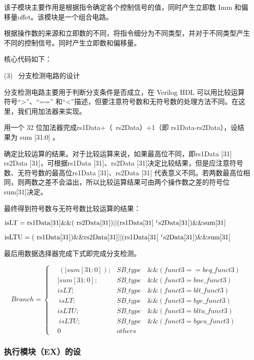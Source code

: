 \documentclass{../source/Experiment}
\begin{document}
        该子模块主要作用是根据指令确定各个控制信号的值，同时产生立即数 Imm 和偏移量offet。该模块是一个组合电路。

        根据操作数的来源和立即数的不同，将指令细分为不同类型，并对于不同类型产生不同的控制信号。同时产生立即数和偏移量。

        核心代码如下：

        (3) \, 分支检测电路的设计

        分支检测电路主要用于判断分支条件是否成立，在 Verilog HDL 可以用比较运算符号“>”、“==” 和“<”描述，但要注意符号数和无符号数的处理方法不同。在这里，我们用加法器来实现。

        用一个 32 位加法器完成rs1Data+（~rs2Data）+1（即 rs1Data-rs2Data），设结果为 sum [31:0] 。

        确定比较运算的结果。对于比较运算来说，如果最高位不同，即rs1Data [31]  rs2Data [31]，可根据rs1Data [31]、rs2Data [31]决定比较结果，但是应注意符号数、无符号数的最高位rs1Data [31]、rs2Data [31] 代表意义不同。若两数最高位相同，则两数之差不会溢出，所以比较运算结果可由两个操作数之差的符号位 sum[31]决定。

        最终得到符号数与无符号数比较运算的结果：

        $ \rm isLT=rs1Data[31]\&\&(~rs2Data[31]) || (rs1Data[31]~^rs2Data[31]) \&\& sum[31]$

        $ \rm isLTU= (~rs1Data[31] )\&\& rs2Data[31] || (rs1Data[31]~^rs2Data[31]) \&\& sum[31]$

        最后用数据选择器完成下式即完成分支检测。

        $$Branch = \left\{
            \begin{aligned}
             & ~ (| sum[31 : 0]); & SB\_type & \, \& \& (funct3 == beq\_funct3 )\\
             & | sum[31 : 0];  & SB\_type & \, \& \& (funct3 = bne\_funct3 )\\
             & isLT;  & SB\_type & \, \& \&(funct3 = blt\_funct3 )\\
             & ~ isLT ;  & SB\_type & \, \& \& (funct3 = bge\_funct3 )\\
             & isLTU ;  & SB\_type & \, \& \& (funct3 = bltu\_funct 3)\\
             & ~ isLTU ;  & SB\_type & \, \& \& (funct3 = bgeu\_funct3)\\
             & 0  & others  & 
            \end{aligned}\right.   
        $$

        \subsubsection{执行模块（EX）的设}
\end{document}

